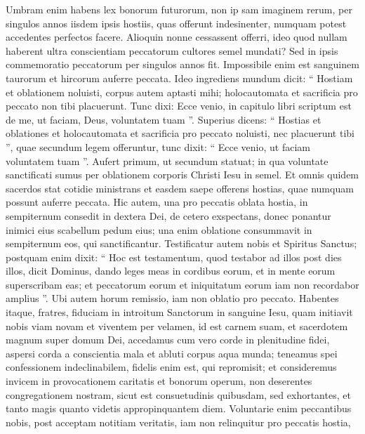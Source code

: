 \begin{biblechapter}
\begin{biblechapter}
\begin{biblechapter}
\begin{biblechapter}
\begin{biblechapter}
\begin{biblechapter}
\begin{biblechapter}
\begin{biblechapter}
\begin{biblechapter}
\begin{biblechapter}
\verse Umbram enim habens lex bonorum futurorum, non ip sam imaginem rerum, per singulos annos iisdem ipsis hostiis, quas offerunt indesinenter, numquam potest accedentes perfectos facere. 
\verse Alioquin nonne cessassent offerri, ideo quod nullam haberent ultra conscientiam peccatorum cultores semel mundati? 
\verse Sed in ipsis commemoratio peccatorum per singulos annos fit. 
 \verse Impossibile enim est sanguinem taurorum et hircorum auferre peccata. 
\verse Ideo ingrediens mundum dicit:
 “ Hostiam et oblationem noluisti,
 corpus autem aptasti mihi;
 \verse holocautomata et sacrificia pro peccato
 non tibi placuerunt.
 \verse Tunc dixi: Ecce venio,
 in capitulo libri scriptum est de me,
 ut faciam, Deus, voluntatem tuam ”.
 \verse Superius dicens: “ Hostias et oblationes et holocautomata et sacrificia pro peccato noluisti, nec placuerunt tibi ”, quae secundum legem offeruntur, 
\verse tunc dixit: “ Ecce venio, ut faciam voluntatem tuam ”. Aufert primum, ut secundum statuat; 
\verse in qua voluntate sanctificati sumus per oblationem corporis Christi Iesu in semel.
 \verse Et omnis quidem sacerdos stat cotidie ministrans et easdem saepe offerens hostias, quae numquam possunt auferre peccata. 
\verse Hic autem, una pro peccatis oblata hostia, in sempiternum consedit in dextera Dei, 
\verse de cetero exspectans, donec ponantur inimici eius scabellum pedum eius; 
\verse una enim oblatione consummavit in sempiternum eos, qui sanctificantur. 
 \verse Testificatur autem nobis et Spiritus Sanctus; postquam enim dixit: 
\verse “ Hoc est testamentum, quod testabor ad illos post dies illos, dicit Dominus, dando leges meas in cordibus eorum, et in mente eorum superscribam eas; 
\verse et peccatorum eorum et iniquitatum eorum iam non recordabor amplius ”.
 \verse Ubi autem horum remissio, iam non oblatio pro peccato.
 \verse Habentes itaque, fratres, fiduciam in introitum Sanctorum in sanguine Iesu, 
\verse quam initiavit nobis viam novam et viventem per velamen, id est carnem suam, 
\verse et sacerdotem magnum super domum Dei, 
\verse accedamus cum vero corde in plenitudine fidei, aspersi corda a conscientia mala et abluti corpus aqua munda; 
\verse teneamus spei confessionem indeclinabilem, fidelis enim est, qui repromisit; 
\verse et consideremus invicem in provocationem caritatis et bonorum operum, 
\verse non deserentes congregationem nostram, sicut est consuetudinis quibusdam, sed exhortantes, et tanto magis quanto videtis appropinquantem diem.
 \verse Voluntarie enim peccantibus nobis, post acceptam notitiam veritatis, iam non relinquitur pro peccatis hostia, 

\end{biblechapter}
\end{biblechapter}
\end{biblechapter}
\end{biblechapter}
\end{biblechapter}
\end{biblechapter}
\end{biblechapter}
\end{biblechapter}
\end{biblechapter}
\end{biblechapter}
